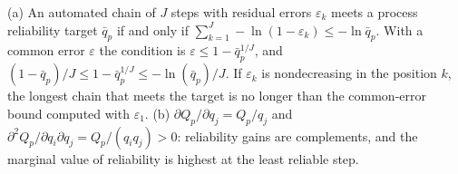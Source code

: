 \begin{lemma}\label{lem:tasks-oring}
(a) An automated chain of $J$ steps with residual errors $\varepsilon_k$ meets a process reliability target $\bar q_p$ if and only if $\sum_{k=1}^J-\ln(1-\varepsilon_k)\le-\ln\bar q_p$. With a common error $\varepsilon$ the condition is $\varepsilon\le 1-\bar q_p^{1/J}$, and $(1-\bar q_p)/J\le 1-\bar q_p^{1/J}\le-\ln(\bar q_p)/J$. If $\varepsilon_k$ is nondecreasing in the position $k$, the longest chain that meets the target is no longer than the common-error bound computed with $\varepsilon_1$. (b) $\partial Q_p/\partial q_j=Q_p/q_j$ and $\partial^2Q_p/\partial q_i\partial q_j=Q_p/(q_iq_j)>0$: reliability gains are complements, and the marginal value of reliability is highest at the least reliable step.
\end{lemma}

